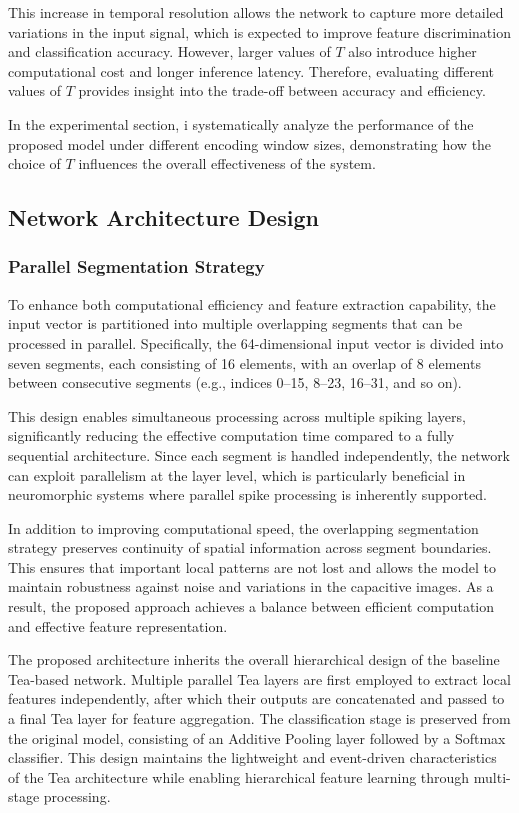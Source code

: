 \documentclass[../main.tex]{subfiles}
\begin{document}
This increase in temporal resolution allows the network to capture more detailed variations in the input signal, which is expected to improve feature discrimination and classification accuracy. However, larger values of $T$ also introduce higher computational cost and longer inference latency. Therefore, evaluating different values of $T$ provides insight into the trade-off between accuracy and efficiency.

In the experimental section, i systematically analyze the performance of the proposed model under different encoding window sizes, demonstrating how the choice of $T$ influences the overall effectiveness of the system.

\subsection{Network Architecture Design}

\subsubsection{Parallel Segmentation Strategy}

To enhance both computational efficiency and feature extraction capability, the input vector is partitioned into multiple overlapping segments that can be processed in parallel. Specifically, the 64-dimensional input vector is divided into seven segments, each consisting of 16 elements, with an overlap of 8 elements between consecutive segments (e.g., indices 0--15, 8--23, 16--31, and so on).

This design enables simultaneous processing across multiple spiking layers, significantly reducing the effective computation time compared to a fully sequential architecture. Since each segment is handled independently, the network can exploit parallelism at the layer level, which is particularly beneficial in neuromorphic systems where parallel spike processing is inherently supported.

In addition to improving computational speed, the overlapping segmentation strategy preserves continuity of spatial information across segment boundaries. This ensures that important local patterns are not lost and allows the model to maintain robustness against noise and variations in the capacitive images. As a result, the proposed approach achieves a balance between efficient computation and effective feature representation.

The proposed architecture inherits the overall hierarchical design of the baseline Tea-based network. Multiple parallel Tea layers \cite{RANC} are first employed to extract local features independently, after which their outputs are concatenated and passed to a final Tea layer for feature aggregation. The classification stage is preserved from the original model, consisting of an Additive Pooling \cite{RANC} layer followed by a Softmax classifier. This design maintains the lightweight and event-driven characteristics of the Tea architecture while enabling hierarchical feature learning through multi-stage processing.
\end{document}
